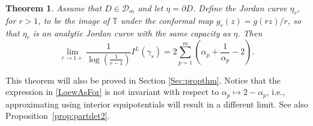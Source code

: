 \documentclass{article}
\numberwithin{equation}{section}
\numberwithin{figure}{section}
\theoremstyle{plain}
\theoremstyle{plain}
\numberwithin{thm}{section}
\newtheorem{theorem}[thm]{Theorem}
\theoremstyle{remark}
\begin{document}
\begin{theorem}\label{Thm:LoewAs}
Assume that $D \in \mathcal{D}_m$ and let $\eta = \partial D$. Define the Jordan curve $\eta_r$, for $r>1$, to be the image of $\mathbb{T}$ under the conformal map $g_r(z)=g(rz)/r$, so that $\eta_r$ is an
analytic Jordan curve with the same capacity as $\eta$. Then
\begin{equation}\label{LoewAsFor}
\lim_{r\to1+}\frac 1{\log(\frac 1{r-1})}I^L(\gamma_r)=2\sum_{p=1}^m \left(\alpha_p+\frac 1{\alpha_p}-2 \right).
\end{equation}
\end{theorem}
This theorem will also be proved in Section \ref{Sec:propthm}. Notice that the expression in \eqref{LoewAsFor} is not invariant with respect to $\alpha_p \mapsto 2-\alpha_p$, i.e., approximating using interior equipotentials will result in a different limit. See also Proposition~\ref{prop:partdet2}.
\end{document}
